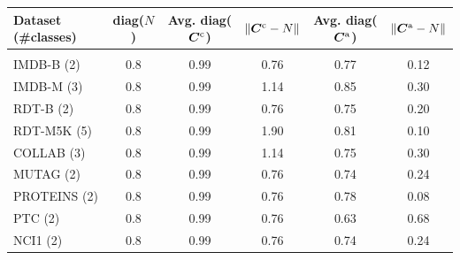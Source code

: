 \documentclass[portrait,final,archD,fontscale=0.477]{baposter}
\newcommand{\norm}[1]{\left\lVert#1\right\rVert}
\begin{document}
\begin{poster}
{\hspace{5em}
\begin{tabular}{l|ccccc}
\bf{Dataset} (\#classes) & diag($N$) & Avg. diag(${\bm{C}}^{\text{c}}$) & $\norm{\mC^{\text{c}}-N}$ & Avg. diag(${\bm{C}}^{\text{a}}$) & $\norm{\mC^{\text{a}}-N}$ \\
\hline \\
IMDB-B   (2) & 0.8  & 0.99   & 0.76  & 0.77 & 0.12\\
IMDB-M   (3) & 0.8  & 0.99   & 1.14  & 0.85 & 0.30\\
RDT-B    (2) & 0.8  & 0.99   & 0.76  & 0.75 & 0.20\\
RDT-M5K  (5) & 0.8  & 0.99   & 1.90  & 0.81 & 0.10\\
COLLAB   (3) & 0.8  & 0.99   & 1.14  & 0.75 & 0.30\\
MUTAG    (2) & 0.8  & 0.99   & 0.76  & 0.74 & 0.24\\
PROTEINS (2) & 0.8  & 0.99   & 0.76  & 0.78 & 0.08\\
PTC      (2) & 0.8  & 0.99   & 0.76  & 0.63 & 0.68\\
NCI1     (2) & 0.8  & 0.99   & 0.76  & 0.74 & 0.24\\
\end{tabular}
\vspace{1em}

}

\end{poster}
\end{document}
